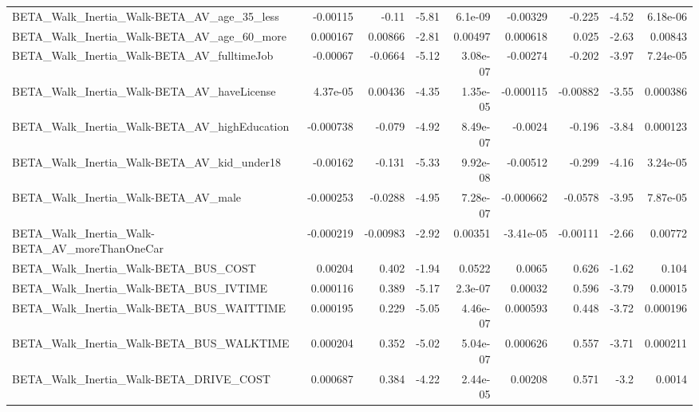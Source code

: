 \begin{tabular}{lrrrrrrrr}
BETA\_Walk\_Inertia\_Walk-BETA\_AV\_age\_35\_less         &    -0.00115 &        -0.11 &    -5.81 &  6.1e-09 &   -0.00329 &      -0.225 &        -4.52 &      6.18e-06 \\
BETA\_Walk\_Inertia\_Walk-BETA\_AV\_age\_60\_more         &    0.000167 &      0.00866 &    -2.81 &  0.00497 &   0.000618 &       0.025 &        -2.63 &       0.00843 \\
BETA\_Walk\_Inertia\_Walk-BETA\_AV\_fulltimeJob         &    -0.00067 &      -0.0664 &    -5.12 & 3.08e-07 &   -0.00274 &      -0.202 &        -3.97 &      7.24e-05 \\
BETA\_Walk\_Inertia\_Walk-BETA\_AV\_haveLicense         &    4.37e-05 &      0.00436 &    -4.35 & 1.35e-05 &  -0.000115 &    -0.00882 &        -3.55 &      0.000386 \\
BETA\_Walk\_Inertia\_Walk-BETA\_AV\_highEducation       &   -0.000738 &       -0.079 &    -4.92 & 8.49e-07 &    -0.0024 &      -0.196 &        -3.84 &      0.000123 \\
BETA\_Walk\_Inertia\_Walk-BETA\_AV\_kid\_under18         &    -0.00162 &       -0.131 &    -5.33 & 9.92e-08 &   -0.00512 &      -0.299 &        -4.16 &      3.24e-05 \\
BETA\_Walk\_Inertia\_Walk-BETA\_AV\_male                &   -0.000253 &      -0.0288 &    -4.95 & 7.28e-07 &  -0.000662 &     -0.0578 &        -3.95 &      7.87e-05 \\
BETA\_Walk\_Inertia\_Walk-BETA\_AV\_moreThanOneCar      &   -0.000219 &     -0.00983 &    -2.92 &  0.00351 &  -3.41e-05 &    -0.00111 &        -2.66 &       0.00772 \\
BETA\_Walk\_Inertia\_Walk-BETA\_BUS\_COST               &     0.00204 &        0.402 &    -1.94 &   0.0522 &     0.0065 &       0.626 &        -1.62 &         0.104 \\
BETA\_Walk\_Inertia\_Walk-BETA\_BUS\_IVTIME             &    0.000116 &        0.389 &    -5.17 &  2.3e-07 &    0.00032 &       0.596 &        -3.79 &       0.00015 \\
BETA\_Walk\_Inertia\_Walk-BETA\_BUS\_WAITTIME           &    0.000195 &        0.229 &    -5.05 & 4.46e-07 &   0.000593 &       0.448 &        -3.72 &      0.000196 \\
BETA\_Walk\_Inertia\_Walk-BETA\_BUS\_WALKTIME           &    0.000204 &        0.352 &    -5.02 & 5.04e-07 &   0.000626 &       0.557 &        -3.71 &      0.000211 \\
BETA\_Walk\_Inertia\_Walk-BETA\_DRIVE\_COST             &    0.000687 &        0.384 &    -4.22 & 2.44e-05 &    0.00208 &       0.571 &         -3.2 &        0.0014 \\

\end{tabular}
